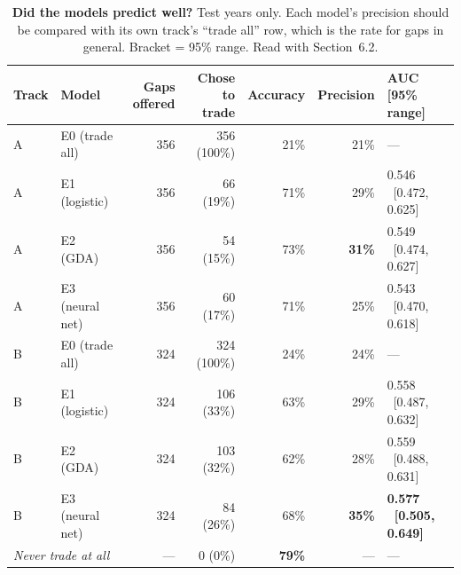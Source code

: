 \documentclass[10pt]{article}
\begin{document}
\begin{table}[!ht]
\centering
\small
\caption{\textbf{Did the models predict well?} Test years only. Each model's
precision should be compared with its own track's ``trade all'' row, which is the
rate for gaps in general. Bracket = 95\% range. Read with Section~6.2.}
\label{tab:predict}
\begin{tabular}{llrrrrl}
\toprule
Track & Model & Gaps offered & Chose to trade & Accuracy & Precision & AUC [95\% range] \\
\midrule
A & E0 (trade all) & 356 & 356 (100\%) & 21\% & 21\% & --- \\
A & E1 (logistic) & 356 & 66 (19\%) & 71\% & 29\% & 0.546 \ [0.472, 0.625] \\
A & E2 (GDA) & 356 & 54 (15\%) & 73\% & \textbf{31\%} & 0.549 \ [0.474, 0.627] \\
A & E3 (neural net) & 356 & 60 (17\%) & 71\% & 25\% & 0.543 \ [0.470, 0.618] \\
\midrule
B & E0 (trade all) & 324 & 324 (100\%) & 24\% & 24\% & --- \\
B & E1 (logistic) & 324 & 106 (33\%) & 63\% & 29\% & 0.558 \ [0.487, 0.632] \\
B & E2 (GDA) & 324 & 103 (32\%) & 62\% & 28\% & 0.559 \ [0.488, 0.631] \\
B & E3 (neural net) & 324 & 84 (26\%) & 68\% & \textbf{35\%} & \textbf{0.577 \ [0.505, 0.649]} \\
\midrule
\multicolumn{2}{l}{\emph{Never trade at all}} & --- & 0 (0\%) & \textbf{79\%} & --- & --- \\
\bottomrule
\end{tabular}
\end{table}
\end{document}
